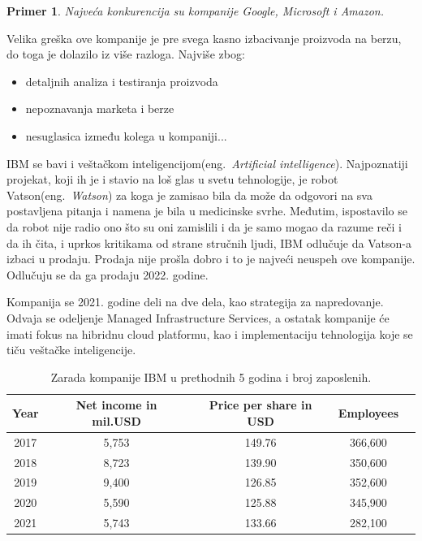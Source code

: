 \documentclass[a4paper]{article}
\newtheorem{primer}{Primer}[section]
\begin{document}
\begin{primer}
Najveća konkurencija su kompanije Google, Microsoft i Amazon.
\end{primer}

Velika greška ove kompanije je pre svega kasno izbacivanje proizvoda na berzu, do toga je dolazilo iz više razloga. Najviše zbog:

\begin{itemize}
\item detaljnih analiza i testiranja proizvoda
\item nepoznavanja marketa i berze
\item nesuglasica između kolega u kompaniji...
\end{itemize}

IBM se bavi i veštačkom inteligencijom(eng.~{\em Artificial intelligence}). Najpoznatiji projekat, koji ih je i stavio na loš glas u svetu tehnologije, je robot Vatson(eng.~{\em Watson}) za koga je zamisao bila da može da odgovori na sva postavljena pitanja i namena je bila u medicinske svrhe. Međutim, ispostavilo se da robot nije radio ono što su oni zamislili i da je samo mogao da razume reči i da ih čita, i uprkos kritikama od strane stručnih ljudi, IBM odlučuje da Vatson-a izbaci u prodaju. Prodaja nije prošla dobro i to je najveći neuspeh ove kompanije. Odlučuju se da ga prodaju 2022. godine.

Kompanija se 2021. godine deli na dve dela, kao strategija za napredovanje. Odvaja se odeljenje Managed Infrastructure Services, a ostatak kompanije će imati fokus na hibridnu cloud platformu, kao i implementaciju tehnologija koje se tiču veštačke inteligencije.


\begin{table}[h!]
\begin{center}
\caption{Zarada kompanije IBM u prethodnih 5 godina i broj zaposlenih. \cite{tabela}}
\begin{tabular}{|c|c|c|c|c|} \hline
Year& Net income in mil.USD& Price per share in USD& Employees \\ \hline
2017	&5,753		&149.76	&366,600\\ \hline
2018	&8,723		&139.90	&350,600\\ \hline
2019	&9,400		&126.85	&352,600\\ \hline
2020	&5,590	  &125.88	&345,900\\ \hline
2021	&5,743		&133.66	&282,100\\ \hline
\end{tabular}
\label{tab:tabela1}
\end{center}
\end{table}
\end{document}
